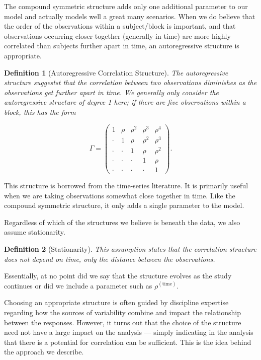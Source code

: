 \documentclass[
]{book}
\theoremstyle{plain}
\theoremstyle{mydefn}
\newtheorem{definition}{Definition}[chapter]
\theoremstyle{myexmpl}
\theoremstyle{remark}
\begin{document}
The compound symmetric structure adds only one additional parameter to our model and actually models well a great many scenarios. When we do believe that the order of the observations within a subject/block is important, and that observations occurring closer together (generally in time) are more highly correlated than subjects further apart in time, an autoregressive structure is appropriate.

\begin{definition}[Autoregressive Correlation Structure]
\protect\hypertarget{def:defn-autoregressive}{}{\label{def:defn-autoregressive} {} }The autoregressive structure suggestst that the correlation between two observations diminishes as the observations get further apart in time. We generally only consider the autoregressive structure of degree 1 here; if there are five observations within a block, this has the form

\[\Gamma = \begin{pmatrix} 
1 & \rho & \rho^2 & \rho^3 & \rho^4 \\
\cdot & 1 & \rho & \rho^2 & \rho^3 \\
\cdot & \cdot & 1 & \rho & \rho^2 \\
\cdot & \cdot & \cdot & 1 & \rho \\
\cdot & \cdot & \cdot & \cdot & 1 \end{pmatrix}.\]
\end{definition}

This structure is borrowed from the time-series literature. It is primarily useful when we are taking observations somewhat close together in time. Like the compound symmetric structure, it only adds a single parameter to the model.

Regardless of which of the structures we believe is beneath the data, we also assume stationarity.

\begin{definition}[Stationarity]
\protect\hypertarget{def:defn-stationarity}{}{\label{def:defn-stationarity} {} }This assumption states that the correlation structure does not depend on time, only the distance between the observations.
\end{definition}

Essentially, at no point did we say that the structure evolves as the study continues or did we include a parameter such as \(\rho^{(\text{time})}\).

Choosing an appropriate structure is often guided by discipline expertise regarding how the sources of variability combine and impact the relationship between the responses. However, it turns out that the choice of the structure need not have a large impact on the analysis --- simply indicating in the analysis that there is a potential for correlation can be sufficient. This is the idea behind the approach we describe.
\end{document}
